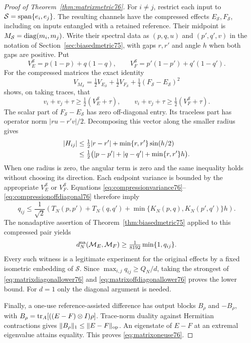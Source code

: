 \begin{proof}[Proof of Theorem~\ref{thm:matrixmetric76}]
For $i\ne j$, restrict each input to
$\mathcal S=\operatorname{span}\{e_i,e_j\}$.  The resulting channels have
the compressed effects $E_{\mathcal S},F_{\mathcal S}$, including
on inputs entangled with a retained reference.  Their midpoint is
$M_{\mathcal S}=\operatorname{diag}(m_i,m_j)$.  Write their spectral data as
$(p,q,u)$ and $(p',q',v)$ in the notation of
Section~\ref{sec:biasedmetric75}, with gaps $r,r'$ and angle $h$
when both gaps are positive.  Put
\[
 V_E^{\mathcal S}=p(1-p)+q(1-q),\qquad
 V_F^{\mathcal S}=p'(1-p')+q'(1-q').
\]
For the compressed matrices the exact identity
\[
 V_{M_{\mathcal S}}=\tfrac12V_{E_{\mathcal S}}
              +\tfrac12V_{F_{\mathcal S}}
              +\tfrac14(F_{\mathcal S}-E_{\mathcal S})^2
\]
shows, on taking traces, that
\begin{equation}\label{eq:compressionvariance76}
 v_i+v_j+\tau\ge\tfrac12(V_E^{\mathcal S}+\tau),
 \qquad
 v_i+v_j+\tau\ge\tfrac12(V_F^{\mathcal S}+\tau).
\end{equation}
The scalar part of $F_{\mathcal S}-E_{\mathcal S}$ has zero
off-diagonal entry.  Its traceless part has operator norm
$|ru-r'v|/2$.  Decomposing this vector along the smaller radius
gives
\begin{align}
 |H_{ij}|&\le\tfrac12|r-r'|+\min\{r,r'\}\sin(h/2)\notag\\
 &\le\tfrac12\bigl(|p-p'|+|q-q'|+\min\{r,r'\}h\bigr).
                                      \label{eq:compressionoffdiagonal76}
\end{align}
When one radius is zero, the angular term is zero and the same
inequality holds without choosing its direction.  Each endpoint
variance is bounded by the appropriate $V_E^{\mathcal S}$ or
$V_F^{\mathcal S}$.  Equations
\eqref{eq:compressionvariance76}--\eqref{eq:compressionoffdiagonal76}
therefore imply
\begin{equation}\label{eq:compressionmodulus76}
 q_{ij}\le\frac1{\sqrt2}
 \left(T_N(p,p')+T_N(q,q')
       +\min\{K_N(p,q),K_N(p',q')\}h\right).
\end{equation}
The nonadaptive assertion of Theorem~\ref{thm:biasedmetric75}
applied to this compressed pair yields
\begin{equation}\label{eq:matrixoffdiagonallower76}
 d_N^{\rm na}(\mathcal M_E,\mathcal M_F)
                         \ge\tfrac1{8192}\min\{1,q_{ij}\}.
\end{equation}
Every such witness is a legitimate experiment for the original
effects by a fixed isometric embedding of $\mathcal S$.
Since $\max_{i,j}q_{ij}\ge Q_N/d$, taking the strongest of
\eqref{eq:matrixdiagonallower76} and
\eqref{eq:matrixoffdiagonallower76} proves the lower bound.
For $d=1$ only the diagonal argument is needed.

Finally, a one-use reference-assisted difference has output blocks
$B_\rho$ and $-B_\rho$, with
$B_\rho=\operatorname{tr}_A[((E-F)\otimes I)\rho]$.  Trace-norm duality
against Hermitian contractions gives
$\|B_\rho\|_1\le\|E-F\|_{\rm op}$.  An eigenstate of
$E-F$ at an extremal eigenvalue attains equality.  This proves
\eqref{eq:matrixoneuse76}.
\end{proof}

